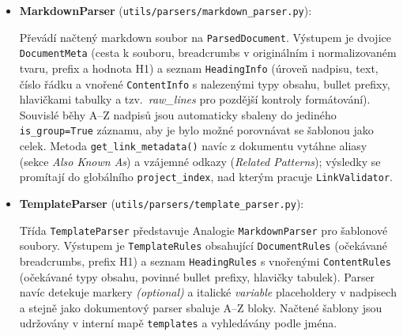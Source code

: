 \documentclass[12pt, a4paper]{article}
\begin{document}
\begin{itemize}
\begin{itemize}
        Modul sdílených parsovacích primitiv. Obsahuje funkce \texttt{parse\_heading\_line()}
        (rozparsuje řádek nadpisu na úroveň, čistý text, odkaz a u šablon i indikátory \emph{optional}
        a italických \emph{variable} placeholderů), \texttt{split\_h1()} (rozdělí H1 na prefix a hodnotu
        podle dvojtečky), \texttt{parse\_breadcrumbs()} (rozpozná breadcrumb řádek od italic instrukcí
        šablony) a \texttt{classify\_content\_line()} (klasifikuje řádek obsahu na typy text, bullet
        list, tabulka, obrázek, odkaz, horizontální čára nebo footnote a extrahuje hlavičky tabulky
        a bullet prefixy). Všechny ostatní parsery pracují právě nad těmito funkcemi.

        \item \textbf{MarkdownParser} (\texttt{utils/parsers/markdown\_parser.py}):

        Převádí načtený markdown soubor na \texttt{ParsedDocument}. Výstupem je dvojice
        \texttt{DocumentMeta} (cesta k souboru, breadcrumbs v originálním i normalizovaném tvaru,
        prefix a hodnota H1) a seznam \texttt{HeadingInfo} (úroveň nadpisu, text, číslo řádku
        a vnořené \texttt{ContentInfo} s nalezenými typy obsahu, bullet prefixy, hlavičkami tabulky
        a tzv.\ \emph{raw\_lines} pro pozdější kontroly formátování). Souvislé běhy A--Z nadpisů
        jsou automaticky sbaleny do jediného \texttt{is\_group=True} záznamu, aby je bylo možné
        porovnávat se šablonou jako celek. Metoda \texttt{get\_link\_metadata()} navíc z dokumentu
        vytáhne aliasy (sekce \emph{Also Known As}) a vzájemné odkazy (\emph{Related Patterns});
        výsledky se promítají do globálního \texttt{project\_index}, nad kterým pracuje
        \texttt{LinkValidator}.

        \item \textbf{TemplateParser} (\texttt{utils/parsers/template\_parser.py}):

        Třída \texttt{TemplateParser} představuje Analogie \texttt{MarkdownParser} pro šablonové soubory. 
        Výstupem je \texttt{TemplateRules}
        obsahující \texttt{DocumentRules} (očekávané breadcrumbs, prefix H1) a seznam
        \texttt{HeadingRules} s vnořenými \texttt{ContentRules} (očekávané typy obsahu, povinné bullet
        prefixy, hlavičky tabulek). Parser navíc detekuje markery \emph{(optional)} a italické
        \emph{variable} placeholdery v nadpisech a stejně jako dokumentový parser sbaluje A--Z bloky.
        Načtené šablony jsou udržovány v interní mapě \texttt{templates} a vyhledávány podle jména.


\end{itemize}
\end{itemize}
\end{document}
